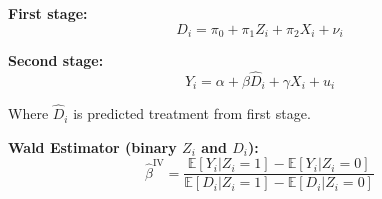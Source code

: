 \textbf{First stage:}
\begin{equation}
D_i = \pi_0 + \pi_1 Z_i + \pi_2 X_i + \nu_i
\end{equation}

\textbf{Second stage:}
\begin{equation}
Y_i = \alpha + \beta \hat{D}_i + \gamma X_i + u_i
\end{equation}

Where $\hat{D}_i$ is predicted treatment from first stage.

\textbf{Wald Estimator (binary $Z_i$ and $D_i$):}
\begin{equation}
\hat{\beta}^{\text{IV}} = \frac{\mathbb{E}[Y_i | Z_i = 1] - \mathbb{E}[Y_i | Z_i = 0]}{\mathbb{E}[D_i | Z_i = 1] - \mathbb{E}[D_i | Z_i = 0]}
\end{equation}

